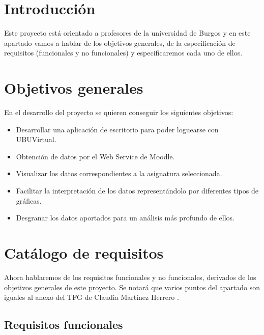 
\section{Introducción}

Este proyecto está orientado a profesores de la universidad de Burgos y en este apartado vamos a hablar de los objetivos generales, de la especificación de requisitos (funcionales y no funcionales) y especificaremos cada uno de ellos.

\section{Objetivos generales}

En el desarrollo del proyecto se quieren conseguir los siguientes objetivos:

\begin{itemize}
	\tightlist
	\item
	Desarrollar una aplicación de escritorio para poder loguearse con UBUVirtual.
	\item
	Obtención de datos por el Web Service de Moodle.
	\item
	Visualizar los datos correspondientes a la asignatura seleccionada.
	\item
	Facilitar la interpretación de los datos representándolo por diferentes tipos de gráficas.
	\item
	Desgranar los datos aportados para un análisis más profundo de ellos.
\end{itemize}

\section{Catálogo de requisitos}

Ahora hablaremos de los requisitos funcionales y no funcionales, derivados de los objetivos generales de este proyecto. Se notará que varios puntos del apartado son iguales al anexo del TFG de Claudia Martínez Herrero \cite{claudia:anexo}.

\subsection{Requisitos funcionales}\label{requisitos-funcionales}

